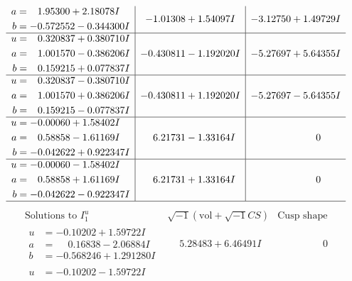 \documentclass[1p]{elsarticle_modified}
\theoremstyle{definition}
\newcommand{\I}{\sqrt{-1}}
\begin{document}
$$\begin{array}{c|c|c}
\begin{aligned}
a &= \phantom{-}1.95300 + 2.18078 I \\
b &= -0.572552 - 0.344300 I\end{aligned}
 & -1.01308 + 1.54097 I & -3.12750 + 1.49729 I \\ \hline\begin{aligned}
u &= \phantom{-}0.320837 + 0.380710 I \\
a &= \phantom{-}1.001570 - 0.386206 I \\
b &= \phantom{-}0.159215 + 0.077837 I\end{aligned}
 & -0.430811 - 1.192020 I & -5.27697 + 5.64355 I \\ \hline\begin{aligned}
u &= \phantom{-}0.320837 - 0.380710 I \\
a &= \phantom{-}1.001570 + 0.386206 I \\
b &= \phantom{-}0.159215 - 0.077837 I\end{aligned}
 & -0.430811 + 1.192020 I & -5.27697 - 5.64355 I \\ \hline\begin{aligned}
u &= -0.00060 + 1.58402 I \\
a &= \phantom{-}0.58858 - 1.61169 I \\
b &= -0.042622 + 0.922347 I\end{aligned}
 & \phantom{-}6.21731 - 1.33164 I & \phantom{-0.000000 } 0 \\ \hline\begin{aligned}
u &= -0.00060 - 1.58402 I \\
a &= \phantom{-}0.58858 + 1.61169 I \\
b &= -0.042622 - 0.922347 I\end{aligned}
 & \phantom{-}6.21731 + 1.33164 I & \phantom{-0.000000 } 0\\
 \hline 
 \end{array}$$\newpage$$\begin{array}{c|c|c}  
\text{Solutions to }I^u_{1}& \I (\text{vol} + \sqrt{-1}CS) & \text{Cusp shape}\\
 \hline 
\begin{aligned}
u &= -0.10202 + 1.59722 I \\
a &= \phantom{-}0.16838 - 2.06884 I \\
b &= -0.568246 + 1.291280 I\end{aligned}
 & \phantom{-}5.28483 + 6.46491 I & \phantom{-0.000000 } 0 \\ \hline\begin{aligned}
u &= -0.10202 - 1.59722 I \\

\end{aligned}
\end{array}$$
\end{document}
